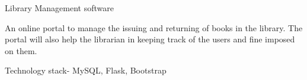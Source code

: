 \begin{cventries}
  \cventry
    {} %
    {Library Management software} %
    {} %
    {} %
    {
      \begin{cvitems} %
        \item {An online portal to manage the issuing and returning of  books in the library. The portal will also help the librarian in keeping track of the users and fine imposed on them. }
        \item {Technology stack- MySQL, Flask, Bootstrap}
      \end{cvitems}
    }

\end{cventries}
